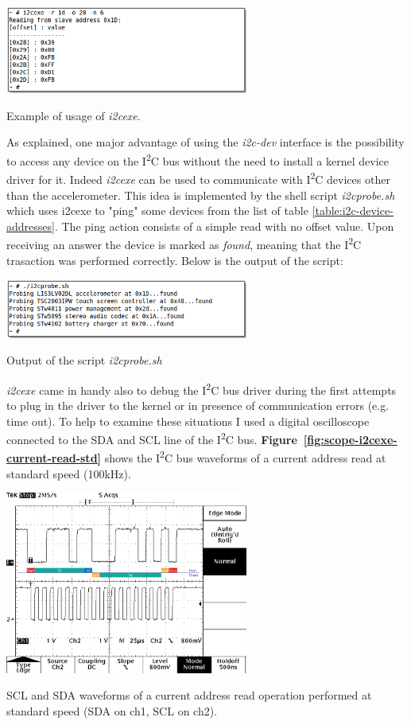 \documentclass[a4paper,10pt]{article}
\makeatletter
\newenvironment{figurehere}{\def\@captype{figure}\vspace{2ex}}{\vspace{2ex}}
\newcommand{\iic}{I\textsuperscript{2}C }
\newcommand{\reff}[1]{\textbf{Figure~\ref{#1}}}
\makeatother
\begin{document}
\begin{multicols}{2}
\begin{figurehere}
 \centering
 \includegraphics[width=8cm]{./figures/dump-i2cexe.png}
 \caption{Example of usage of \emph{i2cexe}.}
 \label{fig:i2cexe-dump}
\end{figurehere}

As explained, one major advantage of using the \emph{i2c-dev} interface is the
possibility to access any device on the \iic bus without the need to install a 
kernel device driver for it. Indeed \emph{i2cexe} can be used to communicate
with \iic devices other than the accelerometer. This idea is implemented by
the shell script \emph{i2cprobe.sh} which uses i2cexe to "ping" some devices
from the list of table \ref{table:i2c-device-addresses}. The ping action
consists of a simple read with no offset value. Upon receiving an answer the
device is marked as \emph{found}, meaning that the \iic trasaction was performed
correctly. Below is the output of the script:

\begin{figurehere}
 \centering
 \includegraphics[width=8cm]{./figures/dump-i2cprobe.png}
 \caption{Output of the script \emph{i2cprobe.sh}}
 \label{fig:i2cprobe}
\end{figurehere}

\emph{i2cexe} came in handy also to debug the \iic bus driver during the first
attempts to plug in the driver to the kernel or in presence of communication
errors (e.g. time out). To help to examine these situations I used a digital
oscilloscope connected to the SDA and SCL line of the \iic bus.
\reff{fig:scope-i2cexe-current-read-std} shows the \iic bus waveforms of a
current address read at standard speed (100kHz).

\begin{figurehere}
 \centering
 \includegraphics[width=8cm]{./figures/scope-i2cexe-current-read-std.png}
 \caption{SCL and SDA waveforms of a current address read operation performed
	at standard speed (SDA on ch1, SCL on ch2).}
 \label{fig:scope-i2cexe-current-read-std}
\end{figurehere}


\end{multicols}
\end{document}
